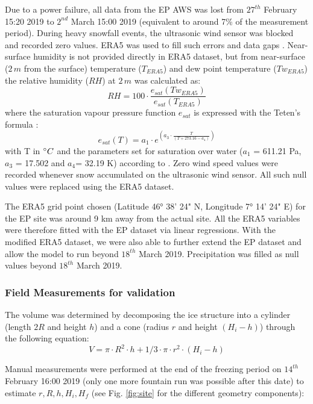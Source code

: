 \documentclass[utf8]{frontiersSCNS} %
\begin{document}
Due to a power failure, all data from the EP AWS was lost from $27^{th}$ February 15:20 2019 to $2^{nd}$ March 15:00
2019 (equivalent to around 7\% of the measurement period). During heavy snowfall events, the ultrasonic wind sensor was
blocked and recorded zero values. ERA5 was used to fill such errors and data gaps .  Near-surface humidity is not
provided directly in ERA5 dataset, but from near-surface ($2\,m$ from the surface) temperature ($T_{ERA5}$) and dew
point temperature ($Tw_{ERA5}$) the relative humidity ($RH$) at $2\,m$  was calculated as: 
\begin{equation} 
  RH = 100 \cdot \frac{e_{sat}(Tw_{ERA5})}{e_{sat}(T_{ERA5})} 
\end{equation} 
where the saturation vapour pressure function $e_{sat}$ is expressed with the Teten's formula \citep{Tetens}: 
  \begin{equation} e_{sat}(T)= a_1 \cdot e^{(a_3 \cdot \frac{T}{(T+273.16-a_4)})} \end{equation} 
with T in $\degree C$ and the parameters set for saturation over water
($a_1$ = 611.21 Pa, $a_3$ = 17.502 and $a_4$= 32.19 K) according to \cite{Buck_1981}.  Zero wind speed values were
recorded whenever snow accumulated on the ultrasonic wind sensor. All such null values were replaced using the ERA5
dataset. 

The ERA5 grid point chosen (Latitude 46° 38' 24" N, Longitude 7° 14' 24" E) for the EP site was around 9 km
away from the actual site.  All the ERA5 variables were therefore fitted with the EP dataset via linear regressions.
With the modified ERA5 dataset, we were also able to further extend the EP dataset and allow the model to
run beyond $18^{th}$ March 2019. Precipitation was filled as null values beyond $18^{th}$ March 2019.


\subsubsection{Field Measurements for validation} \label{section:validation} 
The volume was determined by decomposing the ice structure into a cylinder (length $2R$ and height $h$) and a
cone (radius $r$ and height $(H_i-h)$) through the following equation: 
\begin{equation} V = \pi \cdot R^2 \cdot h + 1/3 \cdot \pi \cdot r^2 \cdot (H_i-h) \end{equation}

Manual measurements were performed at the end of the freezing period on $14^{th}$ February 16:00 2019 (only one more
fountain run was possible after this date) to estimate $r, R, h, H_i, H_f$ (see Fig. \ref{fig:site} for the different
geometry components):
\end{document}
